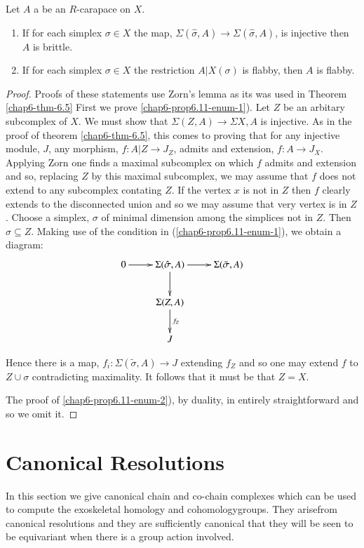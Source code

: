 \begin{secprop}\label{chap6-proposition-6.11}
Let $A$ a be an $R$-carapace on $X$.
    \begin{enumerate}[(1)]
    \item If for each simplex $\sigma \in X$ the map, $\Sigma(\hat{\sigma}, A)\rightarrow \Sigma(\hat{\sigma}, A)$, is injective then $A$ is brittle.\label{chap6-prop6.11-enum-1}
    \item If for each simplex $\sigma \in X$ the restriction $A|{X}(\sigma)$ is flabby, then $A$
     is flabby.\label{chap6-prop6.11-enum-2}
    \end{enumerate}
\end{secprop}

\begin{proof}
Proofs of these statements use Zorn's lemma as its was used in Theorem \ref{chap6-thm-6.5} First we prove
\ref{chap6-prop6.11-enum-1}). Let $Z$ be an arbitary subcomplex of $X$. We must show that $\Sigma(Z, A)\rightarrow \Sigma{X, A}$ is injective. As in the proof of theorem \ref{chap6-thm-6.5}, this comes to proving that for any injective module, $J$, any morphism, $f: A|Z \rightarrow J_{Z}$, admits and extension, $f:A\rightarrow J_{X}$. Applying Zorn one finds a maximal subcomplex on which $f$ admits and extension and so, replacing $Z$ by this maximal subcomplex, we may assume that $f$ does not extend to any subcomplex contating $Z$. If the vertex $x$ is not in $Z$ then $f$ clearly extends  to the disconnected union and so we may assume that very vertex is in $Z$. Choose a simplex, $\sigma$ of minimal dimension among the simplices not in $Z$.  Then $\hat{\sigma} \subseteq Z$. Making use of the condition in
(\ref{chap6-prop6.11-enum-1}), we obtain a diagram:
$$
\xymatrix{
0 \ar[r] &\Sigma(\hat{\sigma}, A)\ar [d] \ar[r]& \Sigma(\tilde{\sigma}, A)\\
         & \Sigma(Z, A)\ar[d]^{f_{Z}} & \\
         & J                           &
}
$$

Hence there is a map, $f_{i} : \Sigma(\tilde{\sigma}, A) \rightarrow J$ extending $f_{Z}$ and so one may extend $f$ to $Z\cup \sigma$ contradicting maximality. It follows that it must be that $Z=X$.

The proof of \ref{chap6-prop6.11-enum-2}), by duality, in entirely straightforward and so we omit it.
\end{proof}

\section{Canonical Resolutions}\label{chap6-sec-7}
In this section we give canonical chain and co-chain complexes which can be used to compute the exoskeletal homology and cohomology\break groups. They arise\pageoriginale from canonical resolutions and they are sufficiently canonical that they will be seen to be equivariant when there is a group action involved.

